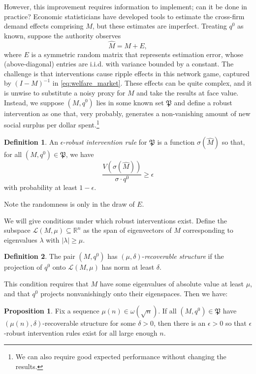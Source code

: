 \documentclass{notices}
\theoremstyle{definition}\newtheorem{problem}{Problem}
\theoremstyle{definition} \newtheorem{remark}{Remark}
\theoremstyle{definition} \newtheorem{claim}{Claim}
\theoremstyle{definition} \newtheorem{thm}{Theorem}
\theoremstyle{definition} \newtheorem*{thmNoNum}{Theorem}
\theoremstyle{definition} \newtheorem{definition}{Definition}
\theoremstyle{definition} \theoremstyle{remark}
\theoremstyle{definition} \newtheorem{note}{Note}
\theoremstyle{definition} \newtheorem{notation}{Notation}
\theoremstyle{definition} \theoremstyle{plain}
\theoremstyle{definition} \newtheorem{condition}{Condition}
\theoremstyle{definition} \newtheorem{lem}{Lemma}
\theoremstyle{definition} \newtheorem{corollary}{Corollary}
\theoremstyle{definition} \newtheorem{prop}{Proposition}
\theoremstyle{definition} \newtheorem{ax}{Axiom}
\theoremstyle{definition} \newtheorem{assumption}{Assumption}
\theoremstyle{definition} \newtheorem{example}{Example}
\theoremstyle{definition} \newtheorem{rmk}{Remark}
\theoremstyle{definition} \newtheorem{res}{Result}
\theoremstyle{definition} \newtheorem{que}{Question}
\theoremstyle{definition} \newtheorem{conjecture}{Conjecture}
\theoremstyle{definition}
\begin{document}
However, this improvement requires information to implement; can it be done in practice?  Economic statisticians have developed tools to estimate the cross-firm demand effects comprising $M$, but these estimates are imperfect. Treating $q^0$ as known, suppose the authority observes $$ \widehat{M} = M + E,$$ where $E$ is a symmetric random matrix that represents estimation error, whose (above-diagonal) entries are i.i.d. with variance bounded by a constant. The challenge is that interventions cause ripple effects in this network game, captured by $(I-M)^{-1}$ in \cref{eq:welfare_market}. These effects can be quite complex, and it is unwise to substitute a noisy proxy for $M$ and take the results at face value. Instead, we suppose $(M,q^0)$ lies in some known set $\mathfrak{P}$ and define a robust intervention as one that, very probably, generates a non-vanishing amount of new social surplus per dollar spent.\footnote{We can also require good expected performance without changing the results.}
\begin{definition} \label{def:robust_intervention} An $\epsilon$-\emph{robust intervention rule} for $\mathfrak{P}$ is a function $\sigma(\widehat{M})$ so that, for all $(M,q^0) \in \mathfrak{P}$, we have
\[
\frac{V(\sigma(\widehat{M}))}{\sigma \cdot q^0} \geq \epsilon
\]
with probability at least $1-\epsilon$. \end{definition}

Note the randomness is only in the draw of $E$. 

We will give conditions under which robust interventions exist. Define the subspace \( \mathcal{L}(M, \mu) \subseteq \mathbb{R}^n \) as the span of eigenvectors of \( M \) corresponding to eigenvalues \( \lambda \) with \( |\lambda| \geq \mu \).
\begin{definition} The pair $(M,q^0)$ has \( (\mu, \delta) \)-\emph{recoverable structure} if the projection of \( q^0 \) onto \( \mathcal{L}(M, \mu) \)  has norm at least $\delta$.\end{definition} This condition  requires that $M$ have some eigenvalues of absolute value at least $\mu$, and that $q^0$ projects nonvanishingly onto their eigenspaces.
Then we have:
\begin{prop} \label{prop:GGGTT}
  Fix a sequence $\mu(n) \in \omega(\sqrt{n})$. If all $ (M,q^0) \in \mathfrak{P}$ have  \( (\mu(n), \delta) \)-recoverable structure for some $\delta>0$, then there is an $\epsilon >0$ so that $\epsilon$-robust intervention rules exist for all large enough $n$.  
\end{prop}
\end{document}
